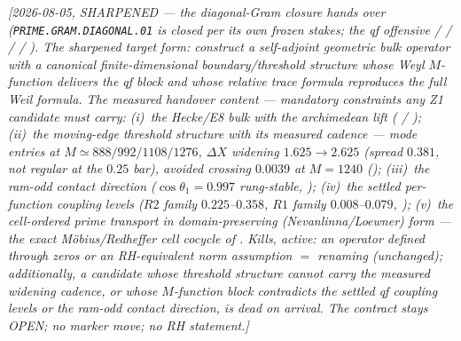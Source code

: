 \documentclass[11pt,a4paper]{article}
\begin{document}
\emph{[2026-08-05, SHARPENED --- the diagonal-Gram closure hands
over (\texttt{PRIME.GRAM.DIAGONAL.01} is closed per its own frozen
stakes; the qf offensive  /
 /
 /
 /
).  The sharpened target form:
construct a self-adjoint geometric \emph{bulk} operator with a
canonical finite-dimensional boundary/threshold structure whose
Weyl $M$-function delivers the qf block and whose relative trace
formula reproduces the full Weil formula.  The \emph{measured
handover content} --- mandatory constraints any Z1 candidate must
carry: (i)~the Hecke/E8 bulk with the archimedean lift
( /
); (ii)~the moving-edge
threshold structure with its measured cadence --- mode entries at
$M\simeq888/992/1108/1276$, $\Delta X$ widening
$1.625\to2.625$ (spread $0.381$, not regular at the $0.25$ bar),
avoided crossing $0.0039$ at $M=1240$
(); (iii)~the ram-odd
contact direction ($\cos\theta_1=0.997$ rung-stable,
); (iv)~the settled
per-function coupling levels ($R2$ family $0.225$--$0.358$, $R1$
family $0.008$--$0.079$,
); (v)~the cell-ordered prime
transport in domain-preserving (Nevanlinna/Loewner) form ---
the exact M\"obius/Redheffer cell cocycle of
.  \emph{Kills, active:} an
operator defined through zeros or an RH-equivalent norm assumption
$=$ renaming (unchanged); additionally, a candidate whose
threshold structure cannot carry the measured widening cadence, or
whose $M$-function block contradicts the settled qf coupling
levels or the ram-odd contact direction, is dead on arrival.  The
contract stays OPEN; no marker move; no RH statement.]}
\end{document}
